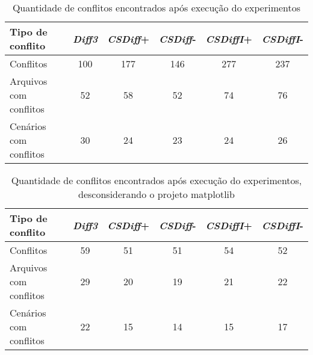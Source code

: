 \begin{table}[ht]
	\begin{center}
		\begin{tabular}{|l|c|c|c|c|c|}
			\hline
			\textbf{Tipo de conflito} & \textbf{\emph{Diff3}} & \textbf{\emph{CSDiff}+} & \textbf{\emph{CSDiff}-} & \textbf{\emph{CSDiffI}+} & \textbf{\emph{CSDiffI}-} \\
			\hline
			Conflitos                 & 100                   & 177                     & 146                     & 277                      & 237                      \\
			Arquivos com conflitos    & 52                    & 58                      & 52                      & 74                       & 76                       \\
			Cenários com conflitos    & 30                    & 24                      & 23                      & 24                       & 26                       \\
			\hline
		\end{tabular}
	\end{center}
	\caption{Quantidade de conflitos encontrados após execução do experimentos}\label{tabelaPP1_com_matplotlib}
\end{table}

\begin{table}[ht]
	\begin{center}
		\begin{tabular}{|l|c|c|c|c|c|}
			\hline
			\textbf{Tipo de conflito} & \textbf{\emph{Diff3}} & \textbf{\emph{CSDiff}+} & \textbf{\emph{CSDiff}-} & \textbf{\emph{CSDiffI}+} & \textbf{\emph{CSDiffI}-} \\
			\hline
			Conflitos                 & 59                    & 51                      & 51                      & 54                       & 52                       \\
			Arquivos com conflitos    & 29                    & 20                      & 19                      & 21                       & 22                       \\
			Cenários com conflitos    & 22                    & 15                      & 14                      & 15                       & 17                       \\
			\hline
		\end{tabular}
	\end{center}
	\caption{Quantidade de conflitos encontrados após execução do experimentos, desconsiderando o
		projeto matplotlib}\label{tabelaPP1_sem_matplotlib}
\end{table}

